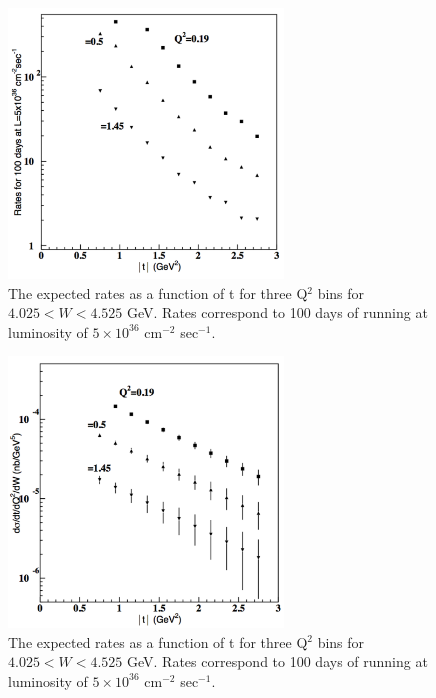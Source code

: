 \begin{figure}[htbp]
\begin{center} 
\includegraphics[width=0.65\textwidth]{jpsi_rates_3q2.pdf}
\caption{The expected rates as a function of t  for three Q$^2$ bins for $4.025 < W < 4.525$ GeV. Rates correspond to 100 days of running at luminosity of $5\times10^{36}$ cm$^{-2}$ sec$^{-1}$.}
\label{fig:jp_rates}
\end{center}
\end{figure}

 \begin{figure}[htbp]
\begin{center} 
\includegraphics[width=0.65\textwidth]{jpsi_xs_3q2_errors.pdf}
\caption{The expected rates as a function of t  for three Q$^2$ bins for $4.025 < W < 4.525$ GeV. Rates correspond to 100 days of running at luminosity of $5\times10^{36}$ cm$^{-2}$ sec$^{-1}$.}
\label{fig:jp_xs}
\end{center}
\end{figure}


 
 
